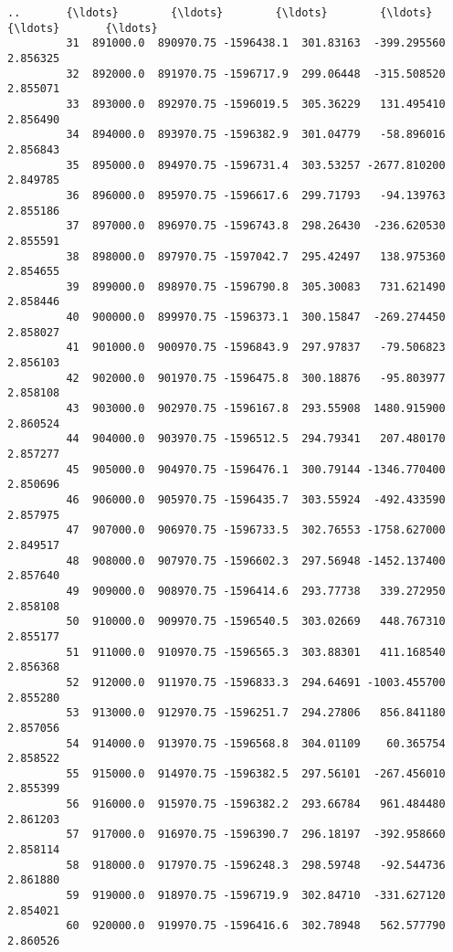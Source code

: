 \documentclass[11pt]{article}
\begin{document}
\begin{Verbatim}[commandchars=\\\{\}]
         ..       {\ldots}        {\ldots}        {\ldots}        {\ldots}          {\ldots}       {\ldots}   
         31  891000.0  890970.75 -1596438.1  301.83163  -399.295560  2.856325   
         32  892000.0  891970.75 -1596717.9  299.06448  -315.508520  2.855071   
         33  893000.0  892970.75 -1596019.5  305.36229   131.495410  2.856490   
         34  894000.0  893970.75 -1596382.9  301.04779   -58.896016  2.856843   
         35  895000.0  894970.75 -1596731.4  303.53257 -2677.810200  2.849785   
         36  896000.0  895970.75 -1596617.6  299.71793   -94.139763  2.855186   
         37  897000.0  896970.75 -1596743.8  298.26430  -236.620530  2.855591   
         38  898000.0  897970.75 -1597042.7  295.42497   138.975360  2.854655   
         39  899000.0  898970.75 -1596790.8  305.30083   731.621490  2.858446   
         40  900000.0  899970.75 -1596373.1  300.15847  -269.274450  2.858027   
         41  901000.0  900970.75 -1596843.9  297.97837   -79.506823  2.856103   
         42  902000.0  901970.75 -1596475.8  300.18876   -95.803977  2.858108   
         43  903000.0  902970.75 -1596167.8  293.55908  1480.915900  2.860524   
         44  904000.0  903970.75 -1596512.5  294.79341   207.480170  2.857277   
         45  905000.0  904970.75 -1596476.1  300.79144 -1346.770400  2.850696   
         46  906000.0  905970.75 -1596435.7  303.55924  -492.433590  2.857975   
         47  907000.0  906970.75 -1596733.5  302.76553 -1758.627000  2.849517   
         48  908000.0  907970.75 -1596602.3  297.56948 -1452.137400  2.857640   
         49  909000.0  908970.75 -1596414.6  293.77738   339.272950  2.858108   
         50  910000.0  909970.75 -1596540.5  303.02669   448.767310  2.855177   
         51  911000.0  910970.75 -1596565.3  303.88301   411.168540  2.856368   
         52  912000.0  911970.75 -1596833.3  294.64691 -1003.455700  2.855280   
         53  913000.0  912970.75 -1596251.7  294.27806   856.841180  2.857056   
         54  914000.0  913970.75 -1596568.8  304.01109    60.365754  2.858522   
         55  915000.0  914970.75 -1596382.5  297.56101  -267.456010  2.855399   
         56  916000.0  915970.75 -1596382.2  293.66784   961.484480  2.861203   
         57  917000.0  916970.75 -1596390.7  296.18197  -392.958660  2.858114   
         58  918000.0  917970.75 -1596248.3  298.59748   -92.544736  2.861880   
         59  919000.0  918970.75 -1596719.9  302.84710  -331.627120  2.854021   
         60  920000.0  919970.75 -1596416.6  302.78948   562.577790  2.860526   
         

\end{Verbatim}
\end{document}
